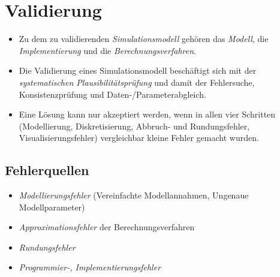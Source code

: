 \documentclass[a4paper, 11pt, accentcolor = tud3b]{tudreport}
\begin{document}

    \chapter{Validierung} %
	    \label{c:sim_validierung}
    
	    \begin{itemize}
	    	\item Zu dem zu validierenden \textit{Simulationsmodell} gehören das \textit{Modell}, die \textit{Implementierung} und die \textit{Berechnungsverfahren}.
	    	\item Die Validierung eines Simulationsmodell beschäftigt sich mit der \textit{systematischen Plausibilitätsprüfung} und damit der Fehlersuche, Konsistenzprüfung und Daten-/Parameterabgleich.
	    	\item Eine Lösung kann nur akzeptiert werden, wenn in allen vier Schritten (Modellierung, Diskretisierung, Abbruch- und Rundungsfehler, Visualisierungsfehler) vergleichbar kleine Fehler gemacht wurden.
	    \end{itemize}

        \section{Fehlerquellen} %
            \begin{itemize}
            	\item \textit{Modellierungsfehler} (Vereinfachte Modellannahmen, Ungenaue Modellparameter)
            	\item \textit{Approximationsfehler} der Berechnungsverfahren
            	\item \textit{Rundungsfehler}
            	\item \textit{Programmier-, Implementierungsfehler}
            \end{itemize}
\end{document}
